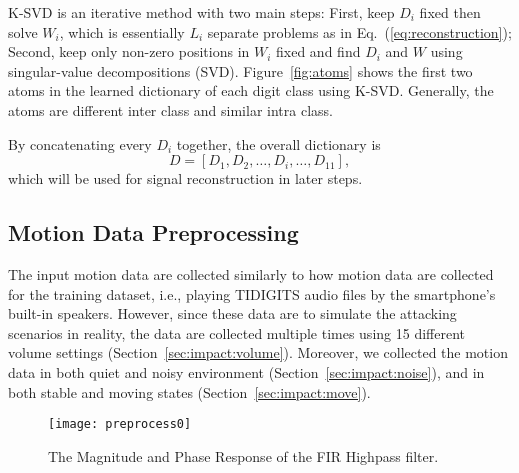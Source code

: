 K-SVD is an iterative method with two main steps: First, keep $D_i$ fixed then solve $W_i$, which is essentially $L_i$ separate problems as in Eq.~(\ref{eq:reconstruction}); Second, keep only non-zero positions in $W_i$ fixed and find $D_i$ and $W$ using singular-value decompositions (SVD). Figure~\ref{fig:atoms} shows the first two atoms in the learned dictionary of each digit class using K-SVD. Generally, the atoms are different inter class and similar intra class.

By concatenating every $D_i$ together, the overall dictionary is 
\begin{equation}
	D = \left[ D_1, D_2, \ldots, D_i, \ldots, D_{11} \right], \label{eq:dictConcat}
\end{equation}
which will be used for signal reconstruction in later steps.





\subsection{Motion Data Preprocessing}
The input motion data are collected similarly to how motion data are collected for the training dataset, i.e., playing TIDIGITS audio files by the smartphone's built-in speakers. However, since these data are to simulate the attacking scenarios in reality, the data are collected multiple times using 15 different volume settings (Section~\ref{sec:impact:volume}). Moreover, we collected the motion data in both quiet and noisy environment (Section~\ref{sec:impact:noise}), and in both stable and moving states (Section~\ref{sec:impact:move}).
\begin{figure*}[!h]
	\centering
	\texttt{[image: preprocess0]}
	\caption{The Magnitude and Phase Response of the FIR Highpass filter.}\label{fig:spyphoneresponse}
\end{figure*}


